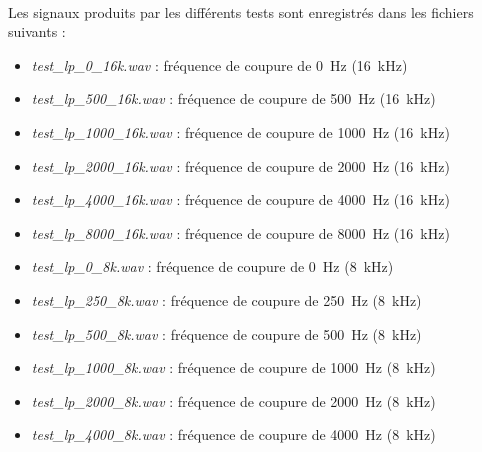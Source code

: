 \documentclass{article}
\begin{document}
    \paragraph{}
    Les signaux produits par les différents tests sont enregistrés dans les fichiers suivants :
    \begin{itemize}
        \item \emph{test\_lp\_0\_16k.wav} : fréquence de coupure de \SI{0}{\hertz} (\SI{16}{\kilo\hertz})
        \item \emph{test\_lp\_500\_16k.wav} : fréquence de coupure de \SI{500}{\hertz} (\SI{16}{\kilo\hertz})
        \item \emph{test\_lp\_1000\_16k.wav} : fréquence de coupure de \SI{1000}{\hertz} (\SI{16}{\kilo\hertz})
        \item \emph{test\_lp\_2000\_16k.wav} : fréquence de coupure de \SI{2000}{\hertz} (\SI{16}{\kilo\hertz})
        \item \emph{test\_lp\_4000\_16k.wav} : fréquence de coupure de \SI{4000}{\hertz} (\SI{16}{\kilo\hertz})
        \item \emph{test\_lp\_8000\_16k.wav} : fréquence de coupure de \SI{8000}{\hertz} (\SI{16}{\kilo\hertz})
        \item \emph{test\_lp\_0\_8k.wav} : fréquence de coupure de \SI{0}{\hertz} (\SI{8}{\kilo\hertz})
        \item \emph{test\_lp\_250\_8k.wav} : fréquence de coupure de \SI{250}{\hertz} (\SI{8}{\kilo\hertz})
        \item \emph{test\_lp\_500\_8k.wav} : fréquence de coupure de \SI{500}{\hertz} (\SI{8}{\kilo\hertz})
        \item \emph{test\_lp\_1000\_8k.wav} : fréquence de coupure de \SI{1000}{\hertz} (\SI{8}{\kilo\hertz})
        \item \emph{test\_lp\_2000\_8k.wav} : fréquence de coupure de \SI{2000}{\hertz} (\SI{8}{\kilo\hertz})
        \item \emph{test\_lp\_4000\_8k.wav} : fréquence de coupure de \SI{4000}{\hertz} (\SI{8}{\kilo\hertz})
    \end{itemize}
\end{document}
